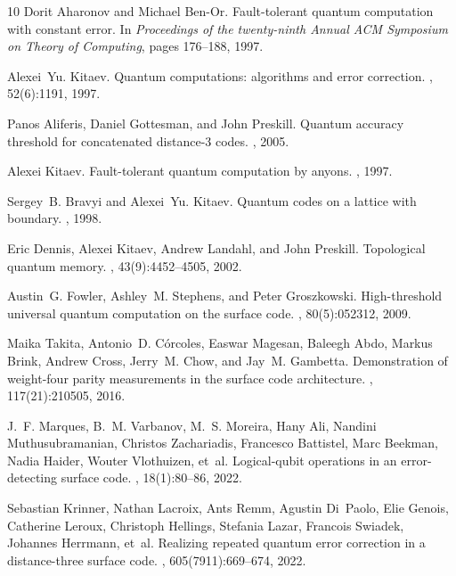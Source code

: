 \documentclass{article}
\begin{document}
\begin{thebibliography}{10}
	Dorit Aharonov and Michael Ben-Or.
	\newblock Fault-tolerant quantum computation with constant error.
	\newblock In {\em Proceedings of the twenty-ninth Annual ACM Symposium on
		Theory of Computing}, pages 176--188, 1997.
	
	Alexei~Yu. Kitaev.
	\newblock Quantum computations: algorithms and error correction.
	, 52(6):1191, 1997.
	
	Panos Aliferis, Daniel Gottesman, and John Preskill.
	\newblock Quantum accuracy threshold for concatenated distance-3 codes.
	, 2005.
	
	Alexei Kitaev.
	\newblock Fault-tolerant quantum computation by anyons.
	, 1997.
	
	Sergey~B. Bravyi and Alexei~Yu. Kitaev.
	\newblock Quantum codes on a lattice with boundary.
	, 1998.
	
	Eric Dennis, Alexei Kitaev, Andrew Landahl, and John Preskill.
	\newblock Topological quantum memory.
	, 43(9):4452--4505, 2002.
	
	Austin~G. Fowler, Ashley~M. Stephens, and Peter Groszkowski.
	\newblock High-threshold universal quantum computation on the surface code.
	, 80(5):052312, 2009.
	
	Maika Takita, Antonio~D. C{\'o}rcoles, Easwar Magesan, Baleegh Abdo, Markus
	Brink, Andrew Cross, Jerry~M. Chow, and Jay~M. Gambetta.
	\newblock Demonstration of weight-four parity measurements in the surface code
	architecture.
	, 117(21):210505, 2016.
	
	J.~F. Marques, B.~M. Varbanov, M.~S. Moreira, Hany Ali, Nandini
	Muthusubramanian, Christos Zachariadis, Francesco Battistel, Marc Beekman,
	Nadia Haider, Wouter Vlothuizen, et~al.
	\newblock Logical-qubit operations in an error-detecting surface code.
	, 18(1):80--86, 2022.
	
	Sebastian Krinner, Nathan Lacroix, Ants Remm, Agustin Di~Paolo, Elie Genois,
	Catherine Leroux, Christoph Hellings, Stefania Lazar, Francois Swiadek,
	Johannes Herrmann, et~al.
	\newblock Realizing repeated quantum error correction in a distance-three
	surface code.
	, 605(7911):669--674, 2022.
	

\end{thebibliography}
\end{document}

